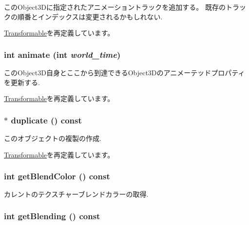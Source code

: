 このObject3Dに指定されたアニメーショントラックを追加する。 既存のトラックの順番とインデックスは変更されるかもしれない. 

\hyperlink{classm3g_1_1Transformable_415c0b110f95410ded9b85e5d99a496b}{Transformable}を再定義しています。\hypertarget{classm3g_1_1Texture2D_8aad1ceab4c2a03609c8a42324ce484d}{
\subsubsection[{animate}]{\setlength{\rightskip}{0pt plus 5cm}int animate (int {\em world\_\-time})}}
\label{classm3g_1_1Texture2D_8aad1ceab4c2a03609c8a42324ce484d}


このObject3D自身とここから到達できるObject3Dのアニメーテッドプロパティを更新する. 

\hyperlink{classm3g_1_1Transformable_8aad1ceab4c2a03609c8a42324ce484d}{Transformable}を再定義しています。\hypertarget{classm3g_1_1Texture2D_f4b50abcea8e4a6d6981c779d5009c05}{
\subsubsection[{duplicate}]{ $\ast$ duplicate () const}}
\label{classm3g_1_1Texture2D_f4b50abcea8e4a6d6981c779d5009c05}


このオブジェクトの複製の作成. 

\hyperlink{classm3g_1_1Transformable_4f64f95a34c56cb1553dc6de660dff6f}{Transformable}を再定義しています。\hypertarget{classm3g_1_1Texture2D_b7dc7b7bf2934448281894f2c1ef3638}{
\subsubsection[{getBlendColor}]{\setlength{\rightskip}{0pt plus 5cm}int getBlendColor () const}}
\label{classm3g_1_1Texture2D_b7dc7b7bf2934448281894f2c1ef3638}


カレントのテクスチャーブレンドカラーの取得. \hypertarget{classm3g_1_1Texture2D_078954de3d786bd11dc98b06f237bbbb}{
\subsubsection[{getBlending}]{\setlength{\rightskip}{0pt plus 5cm}int getBlending () const}}
\label{classm3g_1_1Texture2D_078954de3d786bd11dc98b06f237bbbb}


